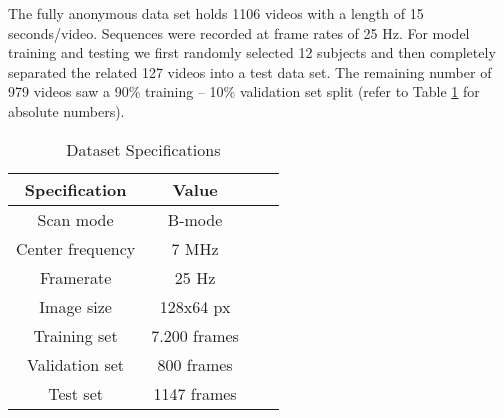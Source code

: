 \documentclass[letterpaper, 10 pt, conference]{ieeeconf}
\begin{document}
The fully anonymous data set holds 1106 videos with a length of 15 seconds/video. Sequences were recorded at frame rates of 25 Hz. For model training and testing we first randomly selected 12 subjects and then completely separated the related 127 videos into a test data set. The remaining number of 979 videos saw a 90\% training -- 10\% validation set split (refer to Table \ref{tab:dataset} for absolute numbers).
\begin{table}[h]
\caption{Dataset Specifications}
\label{tab:dataset}
\begin{center}
\renewcommand{\arraystretch}{1.2}
\hspace*{-1.0cm} 
\setlength{\tabcolsep}{3pt} \begin{tabular}{cccc}
\toprule
\textbf{Specification}      & \textbf{Value}\\ 
\midrule
Scan mode    & B-mode   \\ 
Center frequency & 7 MHz    \\ 
Framerate       & 25 Hz \\
Image size      & 128x64 px \\
Training set     &7.200 frames  \\
Validation set  &800 frames    \\
Test set         & 1147 frames  \\
\bottomrule
\end{tabular}
\end{center}
\end{table}
\end{document}
